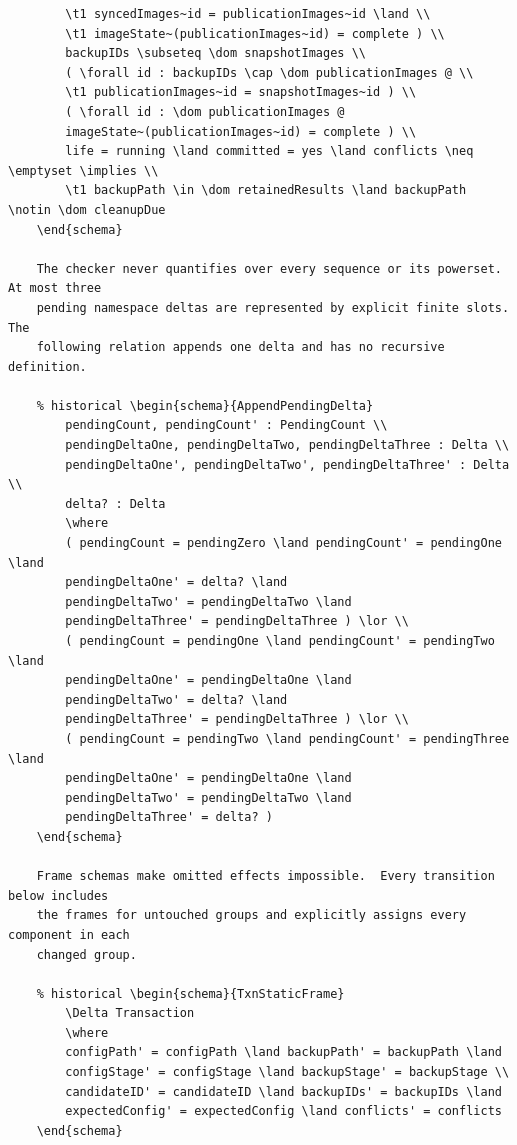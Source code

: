 \documentclass{article}
\begin{document}
\begin{verbatim}
		\t1 syncedImages~id = publicationImages~id \land \\
		\t1 imageState~(publicationImages~id) = complete ) \\
		backupIDs \subseteq \dom snapshotImages \\
		( \forall id : backupIDs \cap \dom publicationImages @ \\
		\t1 publicationImages~id = snapshotImages~id ) \\
		( \forall id : \dom publicationImages @
		imageState~(publicationImages~id) = complete ) \\
		life = running \land committed = yes \land conflicts \neq \emptyset \implies \\
		\t1 backupPath \in \dom retainedResults \land backupPath \notin \dom cleanupDue
	\end{schema}

	The checker never quantifies over every sequence or its powerset.  At most three
	pending namespace deltas are represented by explicit finite slots.  The
	following relation appends one delta and has no recursive definition.

	% historical \begin{schema}{AppendPendingDelta}
		pendingCount, pendingCount' : PendingCount \\
		pendingDeltaOne, pendingDeltaTwo, pendingDeltaThree : Delta \\
		pendingDeltaOne', pendingDeltaTwo', pendingDeltaThree' : Delta \\
		delta? : Delta
		\where
		( pendingCount = pendingZero \land pendingCount' = pendingOne \land
		pendingDeltaOne' = delta? \land
		pendingDeltaTwo' = pendingDeltaTwo \land
		pendingDeltaThree' = pendingDeltaThree ) \lor \\
		( pendingCount = pendingOne \land pendingCount' = pendingTwo \land
		pendingDeltaOne' = pendingDeltaOne \land
		pendingDeltaTwo' = delta? \land
		pendingDeltaThree' = pendingDeltaThree ) \lor \\
		( pendingCount = pendingTwo \land pendingCount' = pendingThree \land
		pendingDeltaOne' = pendingDeltaOne \land
		pendingDeltaTwo' = pendingDeltaTwo \land
		pendingDeltaThree' = delta? )
	\end{schema}

	Frame schemas make omitted effects impossible.  Every transition below includes
	the frames for untouched groups and explicitly assigns every component in each
	changed group.

	% historical \begin{schema}{TxnStaticFrame}
		\Delta Transaction
		\where
		configPath' = configPath \land backupPath' = backupPath \land
		configStage' = configStage \land backupStage' = backupStage \\
		candidateID' = candidateID \land backupIDs' = backupIDs \land
		expectedConfig' = expectedConfig \land conflicts' = conflicts
	\end{schema}


\end{verbatim}
\end{document}
